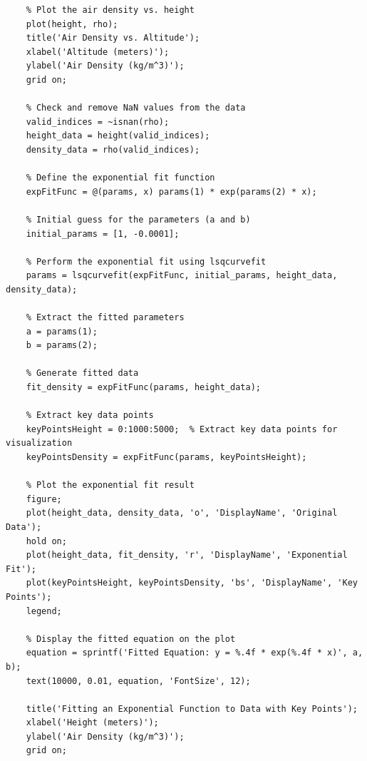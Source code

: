 \documentclass[12pt]{article}
\begin{document}
\begin{lstlisting}
    % Plot the air density vs. height
    plot(height, rho);
    title('Air Density vs. Altitude');
    xlabel('Altitude (meters)');
    ylabel('Air Density (kg/m^3)');
    grid on;

    % Check and remove NaN values from the data
    valid_indices = ~isnan(rho);
    height_data = height(valid_indices);
    density_data = rho(valid_indices);

    % Define the exponential fit function
    expFitFunc = @(params, x) params(1) * exp(params(2) * x);

    % Initial guess for the parameters (a and b)
    initial_params = [1, -0.0001];

    % Perform the exponential fit using lsqcurvefit
    params = lsqcurvefit(expFitFunc, initial_params, height_data, density_data);

    % Extract the fitted parameters
    a = params(1);
    b = params(2);

    % Generate fitted data
    fit_density = expFitFunc(params, height_data);

    % Extract key data points
    keyPointsHeight = 0:1000:5000;  % Extract key data points for visualization
    keyPointsDensity = expFitFunc(params, keyPointsHeight);

    % Plot the exponential fit result
    figure;
    plot(height_data, density_data, 'o', 'DisplayName', 'Original Data');
    hold on;
    plot(height_data, fit_density, 'r', 'DisplayName', 'Exponential Fit');
    plot(keyPointsHeight, keyPointsDensity, 'bs', 'DisplayName', 'Key Points');
    legend;

    % Display the fitted equation on the plot
    equation = sprintf('Fitted Equation: y = %.4f * exp(%.4f * x)', a, b);
    text(10000, 0.01, equation, 'FontSize', 12);

    title('Fitting an Exponential Function to Data with Key Points');
    xlabel('Height (meters)');
    ylabel('Air Density (kg/m^3)');
    grid on;
\end{lstlisting}
\end{document}
